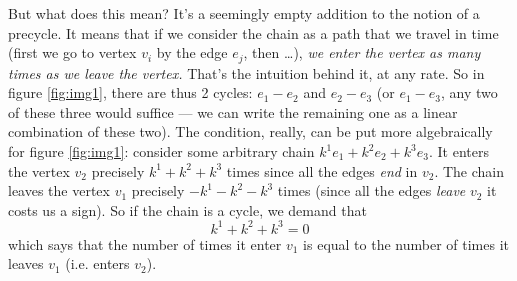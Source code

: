 But what does this mean? It's a seemingly empty addition to the
notion of a precycle. It means that if we consider the chain as a
path that we travel in time (first we go to vertex $v_{i}$ by the
edge $e_{j}$, then \ldots), \emph{we enter the vertex as many times as we leave the vertex.}
That's the intuition behind it, at any rate. So in figure
\ref{fig:img1}, there are thus 2 cycles: $e_{1}-e_{2}$ and
$e_{2}-e_{3}$ (or $e_{1}-e_{3}$, any two of these three would
suffice --- we can write the remaining one as a linear
combination of these two). The condition, really, can be put more
algebraically for figure \ref{fig:img1}: consider some arbitrary
chain $k^{1}e_{1}+k^{2}e_{2}+k^{3}e_{3}$. It enters the vertex
$v_{2}$ precisely $k^{1}+k^{2}+k^{3}$ times since all the edges
\emph{end} in $v_{2}$. The chain leaves the vertex $v_{1}$
precisely $-k^{1}-k^{2}-k^{3}$ times (since all the edges
\emph{leave} $v_{2}$ it costs us a sign). So if the chain is a
cycle, we demand that
\begin{equation}%
k^{1}+k^{2}+k^{3} = 0
\end{equation}
which says that the number of times it enter $v_{1}$ is equal to
the number of times it leaves $v_{1}$ (i.e. enters $v_{2}$).

